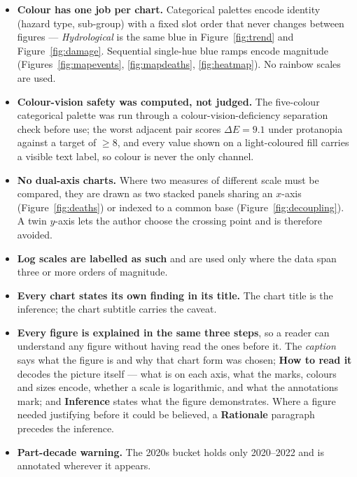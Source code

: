 \documentclass[11pt,a4paper]{article}
\begin{document}
\begin{itemize}
\item \textbf{Colour has one job per chart.} Categorical palettes encode identity
  (hazard type, sub-group) with a fixed slot order that never changes between
  figures --- \emph{Hydrological} is the same blue in Figure~\ref{fig:trend} and
  Figure~\ref{fig:damage}. Sequential single-hue blue ramps encode magnitude
  (Figures~\ref{fig:mapevents}, \ref{fig:mapdeaths}, \ref{fig:heatmap}). No
  rainbow scales are used.
\item \textbf{Colour-vision safety was computed, not judged.} The five-colour
  categorical palette was run through a colour-vision-deficiency separation
  check before use; the worst adjacent pair scores $\Delta E = 9.1$ under
  protanopia against a target of $\geq 8$, and every value shown on a
  light-coloured fill carries a visible text label, so colour is never the only
  channel.
\item \textbf{No dual-axis charts.} Where two measures of different scale must be
  compared, they are drawn as two stacked panels sharing an $x$-axis
  (Figure~\ref{fig:deaths}) or indexed to a common base
  (Figure~\ref{fig:decoupling}). A twin $y$-axis lets the author choose the
  crossing point and is therefore avoided.
\item \textbf{Log scales are labelled as such} and are used only where the data
  span three or more orders of magnitude.
\item \textbf{Every chart states its own finding in its title.} The chart title
  is the inference; the chart subtitle carries the caveat.
\item \textbf{Every figure is explained in the same three steps}, so a reader can
  understand any figure without having read the ones before it. The
  \emph{caption} says what the figure is and why that chart form was chosen;
  \textbf{How to read it} decodes the picture itself --- what is on each axis,
  what the marks, colours and sizes encode, whether a scale is logarithmic, and
  what the annotations mark; and \textbf{Inference} states what the figure
  demonstrates. Where a figure needed justifying before it could be believed, a
  \textbf{Rationale} paragraph precedes the inference.
\item \textbf{Part-decade warning.} The 2020s bucket holds only 2020--2022 and is
  annotated wherever it appears.
\end{itemize}

\end{document}
